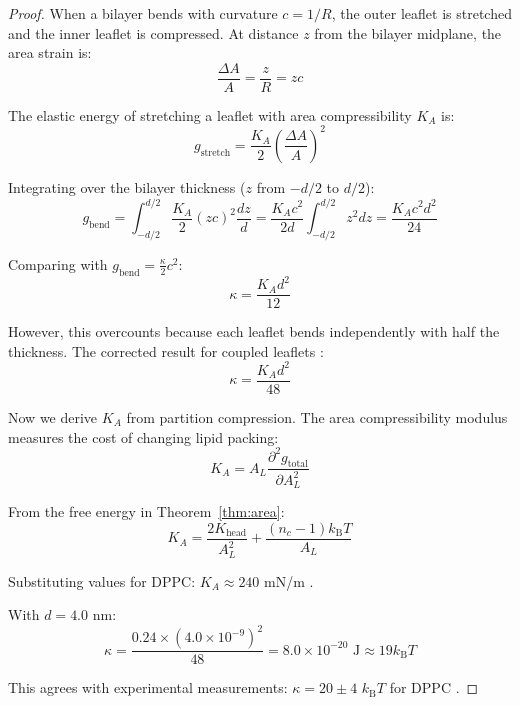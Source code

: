\documentclass[twocolumn,10pt]{article}
\theoremstyle{remark}
\newcommand{\kB}{k_{\mathrm{B}}}
\begin{document}
\begin{proof}
When a bilayer bends with curvature $c = 1/R$, the outer leaflet is stretched and the inner leaflet is compressed. At distance $z$ from the bilayer midplane, the area strain is:
\begin{equation}
    \frac{\Delta A}{A} = \frac{z}{R} = zc
\end{equation}

The elastic energy of stretching a leaflet with area compressibility $K_A$ is:
\begin{equation}
    g_{\text{stretch}} = \frac{K_A}{2}\left(\frac{\Delta A}{A}\right)^2
\end{equation}

Integrating over the bilayer thickness ($z$ from $-d/2$ to $d/2$):
\begin{equation}
    g_{\text{bend}} = \int_{-d/2}^{d/2} \frac{K_A}{2}(zc)^2 \frac{dz}{d} = \frac{K_A c^2}{2d}\int_{-d/2}^{d/2} z^2 dz = \frac{K_A c^2 d^2}{24}
\end{equation}

Comparing with $g_{\text{bend}} = \frac{\kappa}{2}c^2$:
\begin{equation}
    \kappa = \frac{K_A d^2}{12}
\end{equation}

However, this overcounts because each leaflet bends independently with half the thickness. The corrected result for coupled leaflets \cite{rawicz2000}:
\begin{equation}
    \kappa = \frac{K_A d^2}{48}
\end{equation}

Now we derive $K_A$ from partition compression. The area compressibility modulus measures the cost of changing lipid packing:
\begin{equation}
    K_A = A_L \frac{\partial^2 g_{\text{total}}}{\partial A_L^2}
\end{equation}

From the free energy in Theorem~\ref{thm:area}:
\begin{equation}
    K_A = \frac{2K_{\text{head}}}{A_L^2} + \frac{(n_c - 1)\kB T}{A_L}
\end{equation}

Substituting values for DPPC: $K_A \approx 240$ mN/m \cite{rawicz2000}.

With $d = 4.0$ nm:
\begin{equation}
    \kappa = \frac{0.24 \times (4.0 \times 10^{-9})^2}{48} = 8.0 \times 10^{-20} \text{ J} \approx 19 \kB T
\end{equation}

This agrees with experimental measurements: $\kappa = 20 \pm 4$ $\kB T$ for DPPC \cite{rawicz2000,dimova2014}.
\end{proof}
\end{document}
